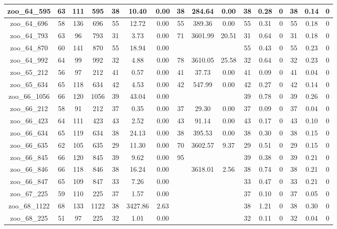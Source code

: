 \begin{landscape}
\begin{longtable}{|c|c|c|c|c|c|c|c|c|c|c|c|c|c|c|c|}
zoo\_64\_595 & 63 & 111 & 595 & 38 & 10.40 & 0.00 & 38 & 284.64 & 0.00 & 38 & 0.28 & 0 & 38 & 0.14 & 0 \\ \hline 
zoo\_64\_696 & 58 & 136 & 696 & 55 & 12.72 & 0.00 & 55 & 389.36 & 0.00 & 55 & 0.31 & 0 & 55 & 0.18 & 0 \\ \hline 
zoo\_64\_793 & 63 & 96 & 793 & 31 & 3.73 & 0.00 & 71 & 3601.99 & 20.51 & 31 & 0.64 & 0 & 31 & 0.18 & 0 \\ \hline 
zoo\_64\_870 & 60 & 141 & 870 & 55 & 18.94 & 0.00 &  &  &  & 55 & 0.43 & 0 & 55 & 0.23 & 0 \\ \hline 
zoo\_64\_992 & 64 & 99 & 992 & 32 & 4.88 & 0.00 & 78 & 3610.05 & 25.58 & 32 & 0.64 & 0 & 32 & 0.23 & 0 \\ \hline 
zoo\_65\_212 & 56 & 97 & 212 & 41 & 0.57 & 0.00 & 41 & 37.73 & 0.00 & 41 & 0.09 & 0 & 41 & 0.04 & 0 \\ \hline 
zoo\_65\_634 & 65 & 118 & 634 & 42 & 4.53 & 0.00 & 42 & 547.99 & 0.00 & 42 & 0.27 & 0 & 42 & 0.14 & 0 \\ \hline 
zoo\_66\_1056 & 66 & 120 & 1056 & 39 & 43.04 & 0.00 &  &  &  & 39 & 0.78 & 0 & 39 & 0.26 & 0 \\ \hline 
zoo\_66\_212 & 58 & 91 & 212 & 37 & 0.35 & 0.00 & 37 & 29.30 & 0.00 & 37 & 0.09 & 0 & 37 & 0.04 & 0 \\ \hline 
zoo\_66\_423 & 64 & 111 & 423 & 43 & 2.52 & 0.00 & 43 & 91.14 & 0.00 & 43 & 0.17 & 0 & 43 & 0.10 & 0 \\ \hline 
zoo\_66\_634 & 65 & 119 & 634 & 38 & 24.13 & 0.00 & 38 & 395.53 & 0.00 & 38 & 0.30 & 0 & 38 & 0.15 & 0 \\ \hline 
zoo\_66\_635 & 62 & 105 & 635 & 29 & 11.30 & 0.00 & 70 & 3602.57 & 9.37 & 29 & 0.51 & 0 & 29 & 0.15 & 0 \\ \hline 
zoo\_66\_845 & 66 & 120 & 845 & 39 & 9.62 & 0.00 & 95 &  &  & 39 & 0.38 & 0 & 39 & 0.21 & 0 \\ \hline 
zoo\_66\_846 & 66 & 118 & 846 & 38 & 16.24 & 0.00 &  & 3618.01 & 2.56 & 38 & 0.74 & 0 & 38 & 0.21 & 0 \\ \hline 
zoo\_66\_847 & 65 & 109 & 847 & 33 & 7.26 & 0.00 &  &  &  & 33 & 0.47 & 0 & 33 & 0.21 & 0 \\ \hline 
zoo\_67\_225 & 59 & 110 & 225 & 37 & 1.57 & 0.00 &  &  &  & 37 & 0.10 & 0 & 37 & 0.05 & 0 \\ \hline 
zoo\_68\_1122 & 68 & 133 & 1122 & 38 & 3427.86 & 2.63 &  &  &  & 38 & 1.21 & 0 & 38 & 0.30 & 0 \\ \hline 
zoo\_68\_225 & 51 & 97 & 225 & 32 & 1.01 & 0.00 &  &  &  & 32 & 0.11 & 0 & 32 & 0.04 & 0 \\ \hline 

\end{longtable}
\end{landscape}
